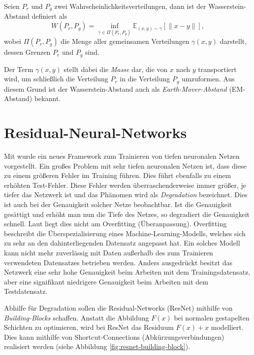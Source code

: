 \begin{definition}
Seien $P_r$ und $P_g$ zwei Wahrscheinlichkeitsverteilungen, dann ist der
Wasserstein-Abstand definiert als
\[
    W(P_r, P_g) = \inf_{\gamma \in \Pi(P_r, P_g)} \mathbb{E}_{(x, y) \sim \gamma} \left[\|x - y\|\right],
\]
wobei $\Pi(P_r, P_g)$ die Menge aller gemeinsamen Verteilungen $\gamma(x,
y)$ darstellt, dessen Grenzen $P_r$ und $P_g$ sind.
\end{definition}

Der Term $\gamma(x, y)$ stellt dabei die \textit{Masse} dar, die von $x$ nach
$y$ transportiert wird, um schließlich die Verteilung $P_r$ in die Verteilung
$P_g$ umzuformen. Aus diesem Grund ist der Wasserstein-Abstand auch als
\textit{Earth-Mover-Abstand} (EM-Abstand) bekannt.

\section{Residual-Neural-Networks}
Mit \cite{he2015deep} wurde ein neues Framework zum Trainieren von tiefen
neuronalen Netzen vorgestellt. Ein großes Problem mit sehr tiefen neuronalen
Netzen ist, dass diese zu einem größeren Fehler im Training führen. Dies führt
ebenfalls zu einem erhöhten Test-Fehler. Diese Fehler werden überraschenderweise
immer größer, je tiefer das Netzwerk ist und das Phänomen wird als
\textit{Degradation} bezeichnet. Dies ist auch bei der Genauigkeit solcher Netze
beobachtbar. Ist die Genauigkeit gesättigt und erhöht man nun die Tiefe des
Netzes, so degradiert die Genauigkeit schnell. Laut \cite{he2015deep} liegt dies
nicht am Overfitting (Überanpassung). Overfitting beschreibt die
Überspezialisierung eines Machine-Learning-Modells, welches sich zu sehr an den
dahinterliegenden Datensatz angepasst hat. Ein solches Modell kann nicht mehr
zuverlässig mit Daten außerhalb des zum Trainieren verwendeten Datensatzes
betrieben werden. Anders ausgedrückt besitzt das Netzwerk eine sehr hohe
Genauigkeit beim Arbeiten mit dem Trainingsdatensatz, aber eine signifikant
niedrigere Genauigkeit beim Arbeiten mit dem Testdatensatz.

Abhilfe für Degradation sollen die Residual-Networks (ResNet) mithilfe von
\textit{Building-Blocks} schaffen. Anstatt die Abbildung $F(x)$ bei normalen
gestapelten Schichten zu optimieren, wird bei ResNet das Residuum $F(x) + x$
modelliert. Dies kann mithilfe von Shortcut-Connections (Abkürzungsverbindungen)
realisiert werden (siehe Abbildung \ref{fig:resnet-building-block}).

